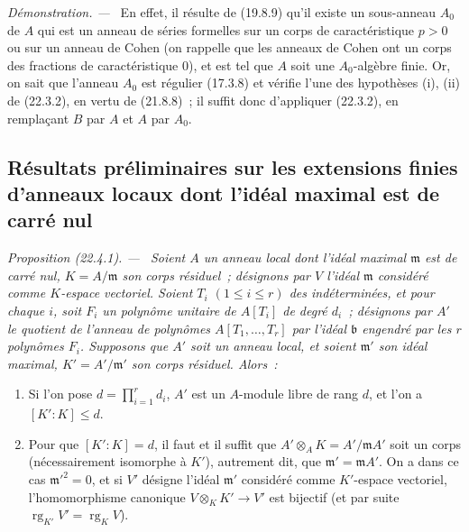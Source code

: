 \documentclass[10pt,oneside]{book}
\makeatletter
\newcommand{\setmanualcurrentlabel}[1]{\def\@currentlabel{#1}}
\newenvironment{proposition}[1][]{%
  \setmanualcurrentlabel{#1}\par\medskip\noindent\itshape Proposition (#1). ---\ }{\par}
\newenvironment{proof}{%
  \par\medskip\noindent\textit{Démonstration. ---\ }}{\par}
\makeatother
\begin{document}
\begin{proof}
En effet, il résulte de (19.8.9) qu'il existe un sous-anneau $A_0$ de $A$
qui est un anneau de séries formelles sur un corps de caractéristique $p>0$
ou sur un anneau de Cohen (on rappelle que les anneaux de Cohen ont un corps
des fractions de caractéristique $0$), et est tel que $A$ soit une
$A_0$-algèbre finie. Or, on sait que l'anneau $A_0$ est régulier (17.3.8) et
vérifie l'une des hypothèses (i), (ii) de (22.3.2), en vertu de (21.8.8)~;
il suffit donc d'appliquer (22.3.2), en remplaçant $B$ par $A$ et $A$ par
$A_0$.
\end{proof}

\subsection{Résultats préliminaires sur les extensions finies d'anneaux locaux dont l'idéal maximal est de carré nul}
\label{subsection:0.22.4-fr}
\label{0.22.4-fr}

\begin{proposition}[22.4.1]
\label{0.22.4.1-fr}
Soient $A$ un anneau local dont l'idéal maximal $\mathfrak m$ est de carré
nul, $K=A/\mathfrak m$ son corps résiduel~; désignons par $V$ l'idéal
$\mathfrak m$ considéré comme $K$-espace vectoriel. Soient $T_i$
$(1\leqslant i\leqslant r)$ des indéterminées, et pour chaque $i$, soit
$F_i$ un polynôme unitaire de $A[T_i]$ de degré $d_i$~; désignons par $A'$ le
quotient de l'anneau de polynômes $A[T_1,\ldots,T_r]$ par l'idéal
$\mathfrak b$ engendré par les $r$ polynômes $F_i$. Supposons que $A'$ soit
un anneau local, et soient $\mathfrak m'$ son idéal maximal,
$K'=A'/\mathfrak m'$ son corps résiduel. Alors~:
\begin{enumerate}
  \item[(i)] Si l'on pose $d=\prod_{i=1}^r d_i$, $A'$ est un $A$-module
  libre de rang $d$, et l'on a $[K':K]\leqslant d$.
  \item[(ii)] Pour que $[K':K]=d$, il faut et il suffit que
  $A'\otimes_AK=A'/\mathfrak mA'$ soit un corps (nécessairement isomorphe à
  $K'$), autrement dit, que $\mathfrak m'=\mathfrak mA'$. On a dans ce cas
  $\mathfrak m'^2=0$, et si $V'$ désigne l'idéal $\mathfrak m'$ considéré
  comme $K'$-espace vectoriel, l'homomorphisme canonique
  $V\otimes_KK'\to V'$ est bijectif (et par suite
  $\operatorname{rg}_{K'}V'=\operatorname{rg}_K V$).
\end{enumerate}
\end{proposition}
\end{document}
